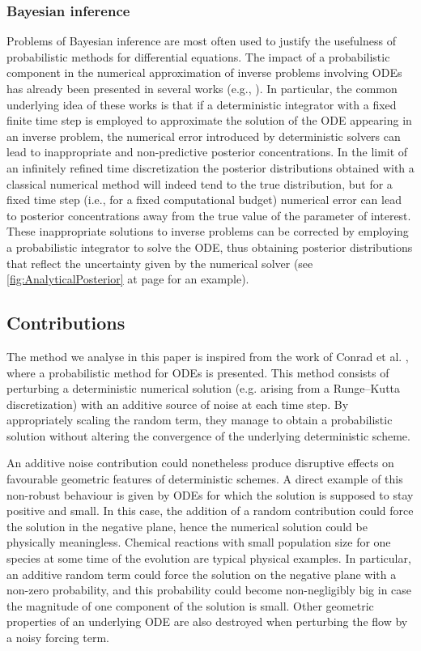 \documentclass[10pt]{article}
\begin{document}
\subsubsection*{Bayesian inference} Problems of Bayesian inference are most often used to justify the usefulness of probabilistic methods for differential equations. The impact of a probabilistic component in the numerical approximation of inverse problems involving ODEs has already been presented in several works (e.g., \cite{CGS17, CCC16, COS17}). In particular, the common underlying idea of these works is that if a deterministic integrator with a fixed finite time step is employed to approximate the solution of the ODE appearing in an inverse problem, the numerical error introduced by deterministic solvers can lead to inappropriate and non-predictive posterior concentrations. In the limit of an infinitely refined time discretization the posterior distributions obtained with a classical numerical method will indeed tend to the true distribution, but for a fixed time step (i.e., for a fixed computational budget) numerical error can lead to posterior concentrations away from the true value of the parameter of interest. These inappropriate solutions to inverse problems can be corrected by employing a probabilistic integrator to solve the ODE, thus obtaining posterior distributions that reflect the uncertainty given by the numerical solver (see \cref{fig:AnalyticalPosterior} at page \pageref{fig:AnalyticalPosterior} for an example).


\subsection{Contributions} The method we analyse in this paper is inspired from the work of Conrad et al. \cite{CGS17}, where a probabilistic method for ODEs is presented. This method consists of perturbing a deterministic numerical solution (e.g. arising from a Runge--Kutta discretization) with an additive source of noise at each time step. By appropriately scaling the random term, they manage to obtain a probabilistic solution without altering the convergence of the underlying deterministic scheme. 

An additive noise contribution could nonetheless produce disruptive effects on favourable geometric features of deterministic schemes. A direct example of this non-robust behaviour is given by ODEs for which the solution is supposed to stay positive and small. In this case, the addition of a random contribution could force the solution in the negative plane, hence the numerical solution could be physically meaningless. Chemical reactions with small population size for one species at some time of the evolution are typical physical examples. In particular, an additive random term could force the solution on the negative plane with a non-zero probability, and this probability could become non-negligibly big in case the magnitude of one component of the solution is small. Other geometric properties of an underlying ODE are also destroyed when perturbing the flow by a noisy forcing term.
\end{document}
